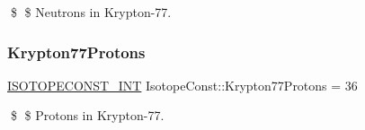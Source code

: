 \$ \$ Neutrons in Krypton-\/77. \mbox{\label{group___isotope_const-_krypton-_kr77_gac02e668a6825b6fa0bdc748a613c485b}} 
\subsubsection{\texorpdfstring{Krypton77\+Protons}{Krypton77Protons}}
{\footnotesize\ttfamily \mbox{\hyperlink{group___isotope_const-_macros_ga5f18360b3e99483a35c32d789e62621c}{I\+S\+O\+T\+O\+P\+E\+C\+O\+N\+S\+T\+\_\+\+I\+NT}} Isotope\+Const\+::\+Krypton77\+Protons = 36}

\$ \$ Protons in Krypton-\/77. 